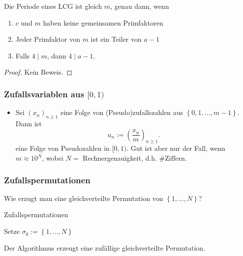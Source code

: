 \begin{lemma}[Knuth]\label{lm:knuth}
    Die Periode eines LCG ist gleich $m$, genau dann, wenn
     \begin{enumerate}[label=\protect\circled{\alph*}]
        \item $c$ und  $m$ haben keine gemeinsamen Primfaktoren
        \item Jeder Primfaktor von  $m$ ist ein Teiler von  $a-1$ 
        \item Falls $4 \mid m$, dann $4 \mid  a-1$.
    \end{enumerate}
\end{lemma}
\begin{proof}
    Kein Beweis.
\end{proof}

\subsubsection{Zufallsvariablen aus $[0,1)$}
 \begin{itemize}
     \item Sei $(x_n)_{n\geq 1}$ eine Folge von (Pseudo)zufallszahlen aus $\left \{0,1,\ldots,m-1\right\} $. Dann ist
         \[
             u_n := \left(\frac{x_n}{m}\right)_{n\geq 1}
         .\] 
         eine Folge von Pseudozahlen in $[0,1)$. Gut ist aber nur der Fall, wenn $m\approx 10^N$, wobei $N=$ Rechnergenauigkeit, d.h. $\#\text{Ziffern}$.
\end{itemize}
\subsubsection{Zufallspermutationen}
\begin{question}
Wie erzugt man eine gleichverteilte Permutation von $\left \{1,\ldots,N\right\} $?
\end{question}
\begin{algorithm}[H]\label{alg:zufällige-permutation}
    \DontPrintSemicolon

    \caption{Zufallspermutationen}
    \;
    Setze $\sigma_0:=\left \{1,\ldots,N\right\} $\;
\end{algorithm}
\begin{lemma}
    Der Algorithmus erzeugt eine zufällige gleichverteilte Permutation.
\end{lemma}

